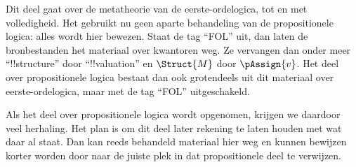 \documentclass[openany]{memoir}
\begin{document}
\begin{editorial}
  Dit deel gaat over de metatheorie van de eerste-ordelogica, tot en met
  volledigheid. Het gebruikt nu geen aparte behandeling van de
  propositionele logica: alles wordt hier bewezen. Staat de tag ``FOL''
  uit, dan laten de bronbestanden het materiaal over kwantoren weg. Ze
  vervangen dan onder meer ``!!{structure}'' door ``!!{valuation}''
  en $\Struct{M}$ door $\pAssign{v}$. Het deel over propositionele
  logica bestaat dan ook grotendeels uit dit materiaal over
  eerste-ordelogica, maar met de tag ``FOL'' uitgeschakeld.

  Als het deel over propositionele logica wordt opgenomen, krijgen we
  daardoor veel herhaling. Het plan is om dit deel later rekening te
  laten houden met wat daar al staat. Dan kan reeds behandeld materiaal
  hier weg en kunnen bewijzen korter worden door naar de juiste plek in
  dat propositionele deel te verwijzen.
\end{editorial}









\endgroup

\begingroup
\def\olfilename{OLP-0139}
\def\olfilepath{content/first-order-logic/introduction/}
\hypertarget{unit-OLP-0139}{}



\endgroup

\begingroup
\def\olfilename{OLP-0140}
\def\olfilepath{content/first-order-logic/introduction/}
\hypertarget{unit-OLP-0140}{}
\end{document}
